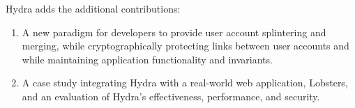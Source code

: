 Hydra adds the additional contributions:
\begin{enumerate}[nosep] 
    \item A new paradigm for developers to provide user account splintering and
        merging, while cryptographically protecting links between user accounts
        and while maintaining application functionality and invariants.
    \item A case study integrating Hydra with a real-world web application,
        Lobsters, and an evaluation of Hydra's effectiveness, performance, and
        security.
\end{enumerate}

